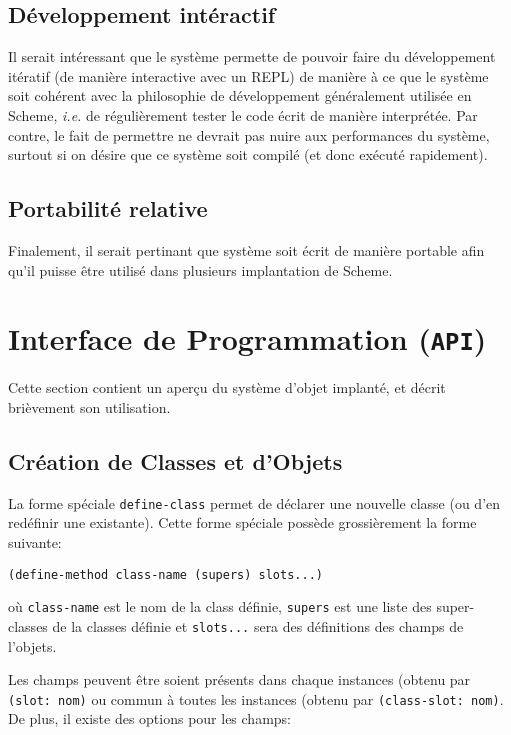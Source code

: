 \documentclass[letterpaper,12pt]{book}
\begin{document}
    \subsection{Développement intéractif}
      Il serait intéressant que le système permette de pouvoir faire
      du développement itératif (de manière interactive avec un REPL)
      de manière à ce que le système soit cohérent avec la philosophie
      de développement généralement utilisée en Scheme, \textit{i.e.}
      de régulièrement tester le code écrit de manière interprétée.
      Par contre, le fait de permettre ne devrait pas nuire aux
      performances du système, surtout si on désire que ce système
      soit compilé (et donc exécuté rapidement).

    \subsection{Portabilité relative}
      Finalement, il serait pertinant que système soit écrit de
      manière portable afin qu'il puisse être utilisé dans plusieurs
      implantation de Scheme. 


  \section{Interface de Programmation (\texttt{API})}
    Cette section contient un aperçu du système d'objet implanté, et
    décrit brièvement son utilisation.
  
    \subsection{Création de Classes et d'Objets}
      La forme spéciale \texttt{define-class} permet de déclarer une
      nouvelle classe (ou d'en redéfinir une existante). Cette forme
      spéciale possède grossièrement la forme suivante:

      \begin{lstlisting}
(define-method class-name (supers) slots...)
      \end{lstlisting}

      où \texttt{class-name} est le nom de la class définie,
      \texttt{supers} est une liste des super-classes de la classes
      définie et \texttt{slots...} sera des définitions des champs de
      l'objets.

      Les champs peuvent être soient présents dans chaque instances
      (obtenu par \texttt{(slot: nom)} ou commun à toutes les
      instances (obtenu par \texttt{(class-slot: nom)}. De plus, il
      existe des options pour les champs:
      
\end{document}
